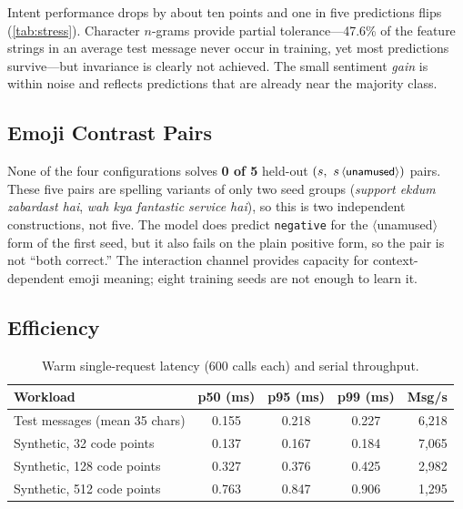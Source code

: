 \documentclass[11pt,a4paper]{article}
\theoremstyle{remark}
\newcommand{\lbl}[1]{\texttt{#1}}                      %
\newcommand{\hi}[1]{\textit{#1}}                       %
\newcommand{\emo}[1]{\textsf{\small$\langle$#1$\rangle$}} %
\begin{document}
Intent performance drops by about ten points and one in five predictions flips
(\cref{tab:stress}). Character $n$-grams provide partial tolerance---47.6\% of
the feature strings in an average test message never occur in training, yet
most predictions survive---but invariance is clearly not achieved. The small
sentiment \emph{gain} is within noise and reflects predictions that are
already near the majority class.

\subsection{Emoji Contrast Pairs}
\label{sec:emoji}

None of the four configurations solves \textbf{0 of 5} held-out
$(s,\ s\,\emo{unamused})$ pairs. These five pairs are spelling variants of only
two seed groups (\hi{support ekdum zabardast hai}, \hi{wah kya fantastic
service hai}), so this is two independent constructions, not five. The model
does predict \lbl{negative} for the \emo{unamused} form of the first seed, but
it also fails on the plain positive form, so the pair is not ``both correct.''
The interaction channel provides capacity for context-dependent emoji meaning;
eight training seeds are not enough to learn it.

\subsection{Efficiency}

\begin{table}[h]
\centering\small
\caption{Warm single-request latency (600 calls each) and serial throughput.}
\label{tab:latency}
\begin{tabular}{@{}l cccr@{}}
\toprule
Workload & p50 (ms) & p95 (ms) & p99 (ms) & Msg/s \\
\midrule
Test messages (mean 35 chars) & 0.155 & 0.218 & 0.227 & 6{,}218 \\
Synthetic, 32 code points     & 0.137 & 0.167 & 0.184 & 7{,}065 \\
Synthetic, 128 code points    & 0.327 & 0.376 & 0.425 & 2{,}982 \\
Synthetic, 512 code points    & 0.763 & 0.847 & 0.906 & 1{,}295 \\
\bottomrule
\end{tabular}
\end{table}
\end{document}
